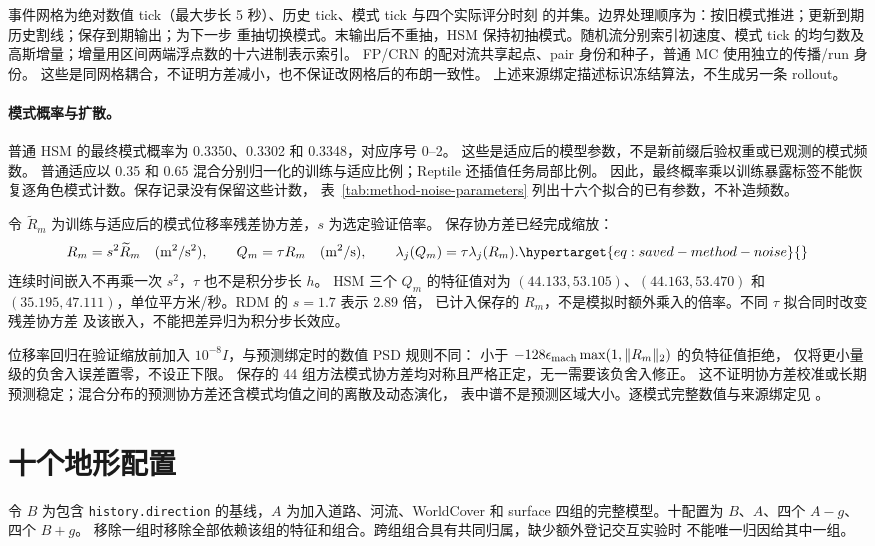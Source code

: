 事件网格为绝对数值 tick（最大步长 5 秒）、历史 tick、模式 tick 与四个实际评分时刻
的并集。边界处理顺序为：按旧模式推进；更新到期历史割线；保存到期输出；为下一步
重抽切换模式。末输出后不重抽，HSM 保持初抽模式。随机流分别索引初速度、模式 tick
的均匀数及高斯增量；增量用区间两端浮点数的十六进制表示索引。
FP/CRN 的配对流共享起点、pair 身份和种子，普通 MC 使用独立的传播/run 身份。
这些是同网格耦合，不证明方差减小，也不保证改网格后的布朗一致性。
上述来源绑定描述标识冻结算法，不生成另一条 rollout。

\paragraph{模式概率与扩散。}
普通 HSM 的最终模式概率为 0.3350、0.3302 和 0.3348，对应序号 0--2。
这些是适应后的模型参数，不是新前缀后验权重或已观测的模式频数。
普通适应以 0.35 和 0.65 混合分别归一化的训练与适应比例；Reptile 还插值任务局部比例。
因此，最终概率乘以训练暴露标签不能恢复逐角色模式计数。保存记录没有保留这些计数，
表~\ref{tab:method-noise-parameters} 列出十六个拟合的已有参数，不补造频数。

令 $\widetilde R_m$ 为训练与适应后的模式位移率残差协方差，$s$ 为选定验证倍率。
保存协方差已经完成缩放：
\begin{equation}
R_m=s^2\widetilde R_m\quad(\mathrm{m}^2/\mathrm{s}^2),\qquad
Q_m=\tau R_m\quad(\mathrm{m}^2/\mathrm{s}),\qquad
\lambda_j(Q_m)=\tau\lambda_j(R_m).
\label{eq:saved-method-noise}\hypertarget{eq:saved-method-noise}{}
\end{equation}
连续时间嵌入不再乘一次 $s^2$，$\tau$ 也不是积分步长 $h$。
HSM 三个 $Q_m$ 的特征值对为 $(44.133,53.105)$、$(44.163,53.470)$ 和
$(35.195,47.111)$，单位平方米/秒。RDM 的 $s=1.7$ 表示 2.89 倍，
已计入保存的 $R_m$，不是模拟时额外乘入的倍率。不同 $\tau$ 拟合同时改变残差协方差
及该嵌入，不能把差异归为积分步长效应。

位移率回归在验证缩放前加入 $10^{-8}I$，与预测绑定时的数值 PSD 规则不同：
小于 $-128\epsilon_{\rm mach}\max(1,\|R_m\|_2)$ 的负特征值拒绝，
仅将更小量级的负舍入误差置零，不设正下限。
保存的 44 组方法模式协方差均对称且严格正定，无一需要该负舍入修正。
这不证明协方差校准或长期预测稳定；混合分布的预测协方差还含模式均值之间的离散及动态演化，
表中谱不是预测区域大小。逐模式完整数值与来源绑定见
。


\section{十个地形配置}
令 \(B\) 为包含 \texttt{history.direction} 的基线，\(A\) 为加入道路、河流、WorldCover
和 surface 四组的完整模型。十配置为 \(B\)、\(A\)、四个 \(A-g\)、四个 \(B+g\)。
移除一组时移除全部依赖该组的特征和组合。跨组组合具有共同归属，缺少额外登记交互实验时
不能唯一归因给其中一组。

